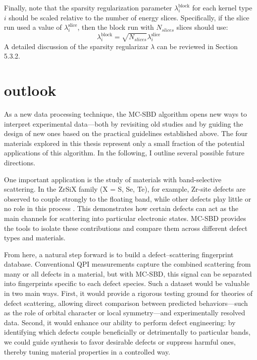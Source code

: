 Finally, note that the sparsity regularization parameter $\lambda_i^{\text{block}}$ for each kernel type $i$ should be scaled relative to the number of energy slices. Specifically, if the slice run used a value of $\lambda_i^{\text{slice}}$, then the block run with $N_{slices}$ slices should use:
\begin{equation}
	\lambda_i^{\text{block}} = \sqrt{N_{slices}}\lambda_i^{\text{slice}}
\end{equation}
A detailed discussion of the sparsity regularizar $\lambda$ can be reviewed in Section 5.3.2. 

\section{outlook}
As a new data processing technique, the MC-SBD algorithm opens new ways to interpret experimental data—both by revisiting old studies and by guiding the design of new ones based on the practical guidelines established above. The four materials explored in this thesis represent only a small fraction of the potential applications of this algorithm. In the following, I outline several possible future directions.

One important application is the study of materials with band-selective scattering. In the ZrSiX family (X = S, Se, Te), for example, Zr-site defects are observed to couple strongly to the floating band, while other defects play little or no role in this process \cite{butlerQuasiparticleInterferenceZrSiS2017}\cite{buVisualizationElectronicTopology2018}\cite{stuartScanningTunnellingMicroscopy2021}. This demonstrates how certain defects can act as the main channels for scattering into particular electronic states. MC-SBD provides the tools to isolate these contributions and compare them across different defect types and materials.

From here, a natural step forward is to build a defect–scattering fingerprint database. Conventional QPI measurements capture the combined scattering from many or all defects in a material, but with MC-SBD, this signal can be separated into fingerprints specific to each defect species. Such a dataset would be valuable in two main ways. First, it would provide a rigorous testing ground for theories of defect scattering, allowing direct comparison between predicted behaviors—such as the role of orbital character or local symmetry—and experimentally resolved data. Second, it would enhance our ability to perform defect engineering: by identifying which defects couple beneficially or detrimentally to particular bands, we could guide synthesis to favor desirable defects or suppress harmful ones, thereby tuning material properties in a controlled way.

